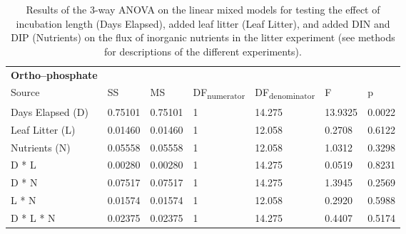 \begin{table}
\begin{tabular}{ l l l l l l l }
\textbf{Ortho--phosphate} & & & & & &\\
Source           & SS      & MS      & DF\textsubscript{numerator} & DF\textsubscript{denominator} & F       & p  \\
Days Elapsed (D) & 0.75101 & 0.75101 & 1                           & 14.275                        & 13.9325 & 0.0022 \\
Leaf Litter (L)  & 0.01460 & 0.01460 & 1                           & 12.058                        & 0.2708  & 0.6122 \\
Nutrients (N)    & 0.05558 & 0.05558 & 1                           & 12.058                        & 1.0312  & 0.3298 \\
D * L            & 0.00280 & 0.00280 & 1                           & 14.275                        & 0.0519  & 0.8231 \\
D * N            & 0.07517 & 0.07517 & 1                           & 14.275                        & 1.3945  & 0.2569 \\
L * N            & 0.01574 & 0.01574 & 1                           & 12.058                        & 0.2920  & 0.5988 \\
D * L * N        & 0.02375 & 0.02375 & 1                           & 14.275                        & 0.4407  & 0.5174 \\

\end{tabular}
\caption{Results of the 3-way ANOVA on the linear mixed models for testing the effect of incubation length (Days Elapsed), added leaf litter (Leaf Litter), and added DIN and DIP (Nutrients) on the flux of inorganic nutrients in the litter experiment (see methods for descriptions of the different experiments).}
\end{table}